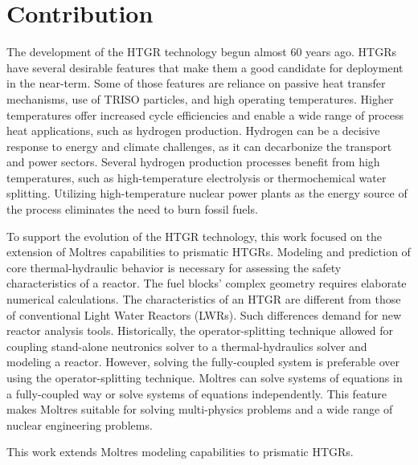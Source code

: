 \section{Contribution}

The development of the HTGR technology begun almost 60 years ago.
HTGRs have several desirable features that make them a good candidate for deployment in the near-term.
Some of those features are reliance on passive heat transfer mechanisms, use of TRISO particles, and high operating temperatures.
Higher temperatures offer increased cycle efficiencies and enable a wide range of process heat applications, such as hydrogen production.
Hydrogen can be a decisive response to energy and climate challenges, as it can decarbonize the transport and power sectors.
Several hydrogen production processes benefit from high temperatures, such as high-temperature electrolysis or thermochemical water splitting.
Utilizing high-temperature nuclear power plants as the energy source of the process eliminates the need to burn fossil fuels.

To support the evolution of the HTGR technology, this work focused on the extension of Moltres capabilities to prismatic HTGRs.
Modeling and prediction of core thermal-hydraulic behavior is necessary for assessing the safety characteristics of a reactor.
The fuel blocks’ complex geometry requires elaborate numerical calculations.
The characteristics of an HTGR are different from those of conventional Light Water Reactors (LWRs).
Such differences demand for new reactor analysis tools.
Historically, the operator-splitting technique allowed for coupling stand-alone neutronics solver to a thermal-hydraulics solver and modeling a reactor.
However, solving the fully-coupled system is preferable over using the operator-splitting technique.
Moltres can solve systems of equations in a fully-coupled way or solve systems of equations independently. This feature makes Moltres suitable for solving multi-physics problems and a wide range of nuclear engineering problems.

This work extends Moltres modeling capabilities to prismatic HTGRs.

